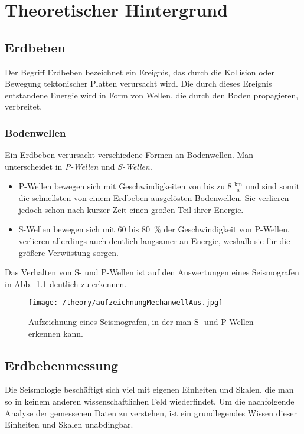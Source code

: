 \documentclass[class=scrbook, crop=false]{standalone}
\begin{document}
\ifstandalone

    
\fi

\chapter{Theoretischer Hintergrund}
\section{Erdbeben}
Der Begriff Erdbeben bezeichnet ein Ereignis, das durch die Kollision oder Bewegung tektonischer Platten verursacht wird. Die durch dieses Ereignis entstandene Energie wird in Form von Wellen, die durch den Boden propagieren, verbreitet.
\subsection{Bodenwellen}
Ein Erdbeben verursacht verschiedene Formen an Bodenwellen. Man unterscheidet in \textit{P-Wellen} und \textit{S-Wellen}.\\
\begin{itemize}
\item
P-Wellen bewegen sich mit Geschwindigkeiten von bis zu $8~\mathrm{\frac{km}{s}}$ und sind somit die schnellsten von einem Erdbeben ausgelösten Bodenwellen. Sie verlieren jedoch schon nach kurzer Zeit einen großen Teil ihrer Energie.
\item
S-Wellen bewegen sich mit 60 bis 80~\% der Geschwindigkeit von P-Wellen, verlieren allerdings auch deutlich langsamer an Energie, weshalb sie für die größere Verwüstung sorgen.
\end{itemize}
Das Verhalten von S- und P-Wellen ist auf den Auswertungen eines Seismografen in Abb.~\ref{fig: wellen} deutlich zu erkennen.
\begin{figure}[h]
	\texttt{[image: /theory/aufzeichnungMechanwellAus.jpg]}
	\label{fig: wellen}
	\caption{Aufzeichnung eines Seismografen, in der man S- und P-Wellen erkennen kann.}
\end{figure}

\section{Erdbebenmessung}
Die Seismologie beschäftigt sich viel mit eigenen Einheiten und Skalen, die man so in keinem anderen wissenschaftlichen Feld wiederfindet. Um die nachfolgende Analyse der gemessenen Daten zu verstehen, ist ein grundlegendes Wissen dieser Einheiten und Skalen unabdingbar.
\end{document}
